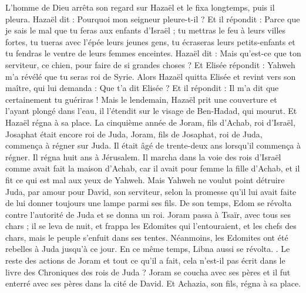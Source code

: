 \begin{multicols}{2}
L'homme de Dieu arrêta son regard sur Hazaël et le fixa longtemps, puis il pleura.
Hazaël dit : Pourquoi mon seigneur pleure-t-il ? Et il répondit : Parce que je sais le mal que tu feras aux enfants d'Israël ; tu mettras le feu à leurs villes fortes, tu tueras avec l'épée leurs jeunes gens, tu écraseras leurs petits-enfants et tu fendras le ventre de leurs femmes enceintes.
Hazaël dit : Mais qu'est-ce que ton serviteur, ce chien, pour faire de si grandes choses ? Et Elisée répondit : Yahweh m'a révélé que tu seras roi de Syrie.
Alors Hazaël quitta Elisée et revint vers son maître, qui lui demanda : Que t'a dit Elisée ? Et il répondit : Il m'a dit que certainement tu guériras !
Mais le lendemain, Hazaël prit une couverture et l'ayant plongé dans l'eau, il l'étendit sur le visage de Ben-Hadad, qui mourut. Et Hazaël régna à sa place.
La cinquième année de Joram, fils d'Achab, roi d'Israël, Josaphat était encore roi de Juda, Joram, fils de Josaphat, roi de Juda, commença à régner sur Juda.
Il était âgé de trente-deux ans lorsqu'il commença à régner. Il régna huit ans à Jérusalem.
Il marcha dans la voie des rois d'Israël comme avait fait la maison d'Achab, car il avait pour femme la fille d'Achab, et il fit ce qui est mal aux yeux de Yahweh.
Mais Yahweh ne voulut point détruire Juda, par amour pour David, son serviteur, selon la promesse qu'il lui avait faite de lui donner toujours une lampe parmi ses fils.
De son temps, Edom se révolta contre l'autorité de Juda et se donna un roi.
Joram passa à Tsaïr, avec tous ses chars ; il se leva de nuit, et frappa les Edomites qui l'entouraient, et les chefs des chars, mais le peuple s'enfuit dans ses tentes.
Néanmoins, les Edomites ont été rebelles à Juda jusqu'à ce jour. En ce même temps, Libna aussi se révolta.
.
Le reste des actions de Joram et tout ce qu'il a fait, cela n'est-il pas écrit dans le livre des Chroniques des rois de Juda ?
Joram se coucha avec ses pères et il fut enterré avec ses pères dans la cité de David. Et Achazia, son fils, régna à sa place.

\end{multicols}
